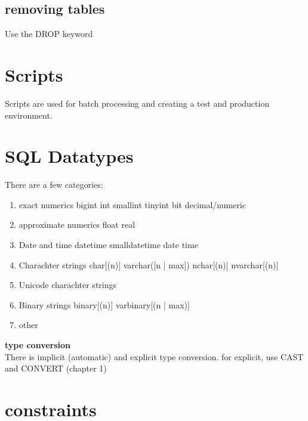 \documentclass{report}
\begin{document}
	\subsection{removing tables}
	Use the DROP keyword
	\section{Scripts}
	Scripts are used for batch processing and creating a test and production environment.
	\section{SQL Datatypes}
	There are a few categories:
	\begin{enumerate}
		\item exact numerics
			\subitem bigint
			\subitem int
			\subitem smallint
			\subitem tinyint
			\subitem bit
			\subitem decimal/numeric
		\item approximate numerics
			\subitem float
			\subitem real

		\item Date and time
			\subitem datetime
			\subitem smalldatetime
			\subitem date
			\subitem time
		\item Charachter strings
			\subitem char[(n)]
			\subitem varchar([n | max])
			\subitem nchar[(n)]
			\subitem nvarchar[(n)]
		\item Unicode charachter strings
		\item Binary strings
			\subitem binary[(n)]
			\subitem varbinary[(n | max)]
		\item other
	\end{enumerate}	
	\textbf{type conversion}\\
	There is implicit (automatic) and explicit type conversion. for explicit, use CAST and CONVERT (chapter 1)
	\section{constraints}
\end{document}
